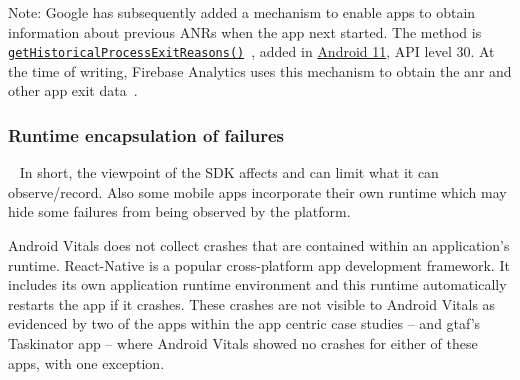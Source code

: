 Note: Google has subsequently added a mechanism to enable apps to obtain information about previous ANRs when the app next started. The method is \href{https://developer.android.com/reference/kotlin/android/app/ActivityManager#gethistoricalprocessexitreasons}{\texttt{getHistoricalProcessExitReasons()}}~, added in \href{https://developer.android.com/about/versions/11}{Android 11}, API level 30.
%
At the time of writing, Firebase Analytics uses this mechanism to obtain the \Gls{anr} and other app exit data~.


\subsubsection{Runtime encapsulation of failures}~\label{tata-runtime-encapsulation-of-errors}
In short, the viewpoint of the SDK affects and can limit what it can observe/record. Also some mobile apps incorporate their own runtime which may hide some failures from being observed by the platform.

Android Vitals does not collect crashes that are contained within an application's runtime. React-Native is a popular cross-platform app development framework. It includes its own application runtime environment and this runtime automatically restarts the app if it crashes. These crashes are not visible to Android Vitals as evidenced by two of the apps within the app centric case studies --  and \Gls{gtaf}'s Taskinator app -- where Android Vitals showed no crashes for either of these apps, with one exception. 


